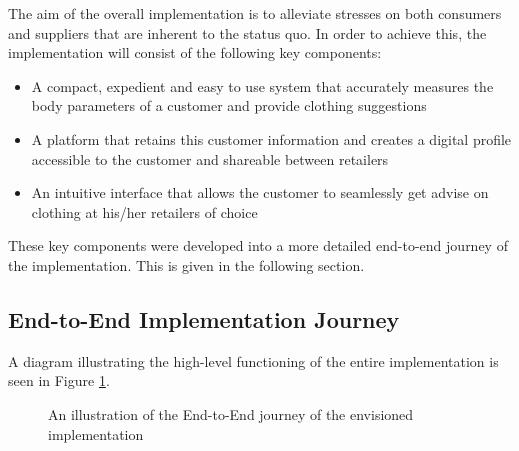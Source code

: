 The aim of the overall implementation is to alleviate stresses on both consumers and suppliers that are inherent to the status quo.  In order to achieve this, the implementation will consist of the following key components: 

\begin{itemize}
	\item A compact, expedient and easy to use system that accurately measures the body parameters of a customer and provide clothing suggestions
	\item A platform that retains this customer information and creates a digital profile accessible to the customer and shareable between retailers  
	\item An intuitive interface that allows the customer to seamlessly get advise on clothing at his/her retailers of choice	
\end{itemize} 

These key components were developed into a more detailed end-to-end journey of the implementation. This is given in the following section.

\subsection{End-to-End Implementation Journey}
A diagram illustrating the high-level functioning of the entire implementation is seen in Figure \ref{fig:endToEndImplementation}.

\begin{figure}[ht]
	\centering
	{%
		\setlength{\fboxsep}{0pt}%
		\setlength{\fboxrule}{0.5pt}%
		}
	\caption{An illustration of the End-to-End journey of the envisioned implementation}
	\label{fig:endToEndImplementation}
\end{figure}

